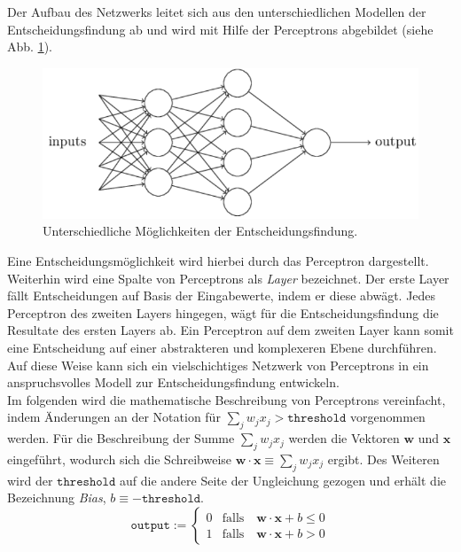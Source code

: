 \noindent
Der Aufbau des Netzwerks leitet sich aus den unterschiedlichen Modellen der Entscheidungsfindung ab und wird mit Hilfe der Perceptrons abgebildet (siehe Abb. \ref{fig:perceptron_models}).
\begin{figure}[hbt]
	\centering
	\includegraphics[scale=0.75]{Bilder/perceptron_models}
	\caption{Unterschiedliche Möglichkeiten der Entscheidungsfindung.} 
	\label{fig:perceptron_models} 
\end{figure}
Eine Entscheidungsmöglichkeit wird hierbei durch das Perceptron dargestellt. Weiterhin wird eine Spalte von Perceptrons als \textit{Layer} bezeichnet. Der erste Layer fällt Entscheidungen auf Basis der Eingabewerte, indem er diese abwägt. Jedes Perceptron des zweiten Layers hingegen, wägt für die Entscheidungsfindung die Resultate des ersten Layers ab. Ein Perceptron auf dem zweiten Layer kann somit eine Entscheidung auf einer abstrakteren und komplexeren Ebene durchführen. Auf diese Weise kann sich ein vielschichtiges Netzwerk von Perceptrons in ein anspruchsvolles Modell zur Entscheidungsfindung entwickeln. \\

\noindent
Im folgenden wird die mathematische Beschreibung von Perceptrons vereinfacht, indem Änderungen an der Notation für $\sum_j w_j x_j > \mathtt{threshold}$ vorgenommen werden. Für die Beschreibung der Summe $\sum_j w_j x_j$ werden die Vektoren $\mathbf{w}$ und $\mathbf{x}$ eingeführt, wodurch sich die Schreibweise $\mathbf{w} \cdot \mathbf{x} \equiv \sum_j w_j x_j$ ergibt. Des Weiteren wird der $\mathtt{threshold}$ auf die andere Seite der Ungleichung gezogen und erhält die Bezeichnung \textit{Bias}, $b \equiv \mathtt{-threshold}$. 
\begin{equation}
	\mathtt{output} := \left\{
	\begin{array}{ll}
 		0 & \displaystyle \mbox{falls}\quad \mathbf{w} \cdot \mathbf{x} + b \leq 0 \\[0.2cm]
 		1 & \displaystyle \mbox{falls}\quad \mathbf{w} \cdot \mathbf{x} + b > 0
	\end{array}\right.
\end{equation}

